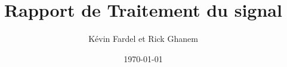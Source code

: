 \documentclass[a4paper, 11pt]{article}           %
\author{Kévin Fardel et Rick Ghanem}
\date{\today}
\title{Rapport de Traitement du signal}
\begin{document}

\maketitle %

\begin{abstract}
\end{abstract}

\tableofcontents %

\lstlistoflistings %

\newpage
\end{document}
